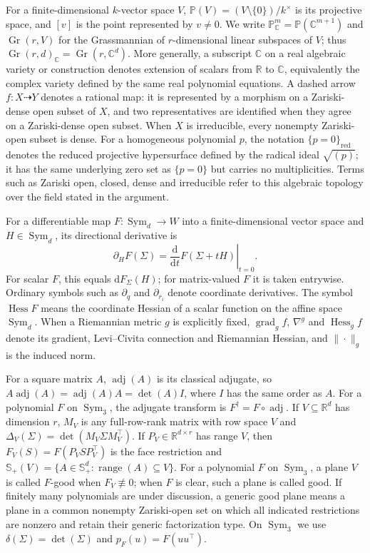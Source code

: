 \documentclass[12pt,a4paper]{article}
\theoremstyle{plain}
\theoremstyle{definition}
\newcommand{\C}{\mathbb{C}}
\newcommand{\R}{\mathbb{R}}
\newcommand{\Smat}{\mathbb{S}}
\newcommand{\Sym}{\operatorname{Sym}}
\newcommand{\adjm}{\operatorname{adj}}
\newcommand{\Gr}{\operatorname{Gr}}
\newcommand{\Hess}{\operatorname{Hess}}
\newcommand{\Range}{\operatorname{range}}
\begin{document}
For a finite-dimensional $k$-vector space $V$, $\mathbb{P}(V)=(V\setminus\{0\})/k^\times$ is its projective space, and $[v]$ is the point represented by $v\ne0$.
We write $\mathbb{P}^m_\C=\mathbb{P}(\C^{m+1})$ and $\Gr(r,V)$ for the Grassmannian of $r$-dimensional linear subspaces of $V$;
thus $\Gr(r,d)_\C=\Gr(r,\C^d)$.
More generally, a subscript $\C$ on a real algebraic variety or construction denotes extension of scalars from $\R$ to $\C$, equivalently the complex variety defined by the same real polynomial equations.
A dashed arrow $f:X\dashrightarrow Y$ denotes a rational map:
it is represented by a morphism on a Zariski-dense open subset of $X$, and two representatives are identified when they agree on a Zariski-dense open subset.
When $X$ is irreducible, every nonempty Zariski-open subset is dense.
For a homogeneous polynomial $p$, the notation $\{p=0\}_{\mathrm{red}}$ denotes the reduced projective hypersurface defined by the radical ideal $\sqrt{(p)}$;
it has the same underlying zero set as $\{p=0\}$ but carries no multiplicities.
Terms such as Zariski open, closed, dense and irreducible refer to this algebraic topology over the field stated in the argument.

For a differentiable map $F:\Sym_d\to W$ into a finite-dimensional vector space and $H\in\Sym_d$, its directional derivative is
\begin{equation*}
    \partial_H F(\Sigma)
    =
    \left.\frac{\mathrm{d}}{\mathrm{d}t}F(\Sigma+tH)\right|_{t=0}
    .
\end{equation*}
For scalar $F$, this equals $\mathrm{d}F_\Sigma(H)$; for matrix-valued $F$ it is taken entrywise.
Ordinary symbols such as $\partial_q$ and $\partial_{r_i}$ denote coordinate derivatives.
The symbol $\Hess F$ means the coordinate Hessian of a scalar function on the affine space $\Sym_d$.
When a Riemannian metric $g$ is explicitly fixed, $\operatorname{grad}_g f$, $\nabla^g$ and $\operatorname{Hess}_g f$ denote its gradient, Levi--Civita connection and Riemannian Hessian, and $\|\cdot\|_g$ is the induced norm.

For a square matrix $A$, $\adjm(A)$ is its classical adjugate, so $A\adjm(A)=\adjm(A)A=\det(A)I$, where $I$ has the same order as $A$.
For a polynomial $F$ on $\Sym_3$, the adjugate transform is $F^\dagger=F\circ\adjm$.
If $V\subseteq\R^d$ has dimension $r$, $M_V$ is any full-row-rank matrix with row space $V$ and $\Delta_V(\Sigma)=\det(M_V\Sigma M_V^\top)$.
If $P_V\in\R^{d\times r}$ has range $V$, then $F_V(S)=F(P_VSP_V^\top)$ is the face restriction and $\Smat_+(V)=\{A\in\Smat^d_+:\Range(A)\subseteq V\}$.
For a polynomial $F$ on $\Sym_3$, a plane $V$ is called $F$-good when $F_V\not\equiv0$;
when $F$ is clear, such a plane is called good.
If finitely many polynomials are under discussion, a generic good plane means a plane in a common nonempty Zariski-open set on which all indicated restrictions are nonzero and retain their generic factorization type.
On $\Sym_3$ we use $\delta(\Sigma)=\det(\Sigma)$ and $p_F(u)=F(uu^\top)$.
\end{document}
